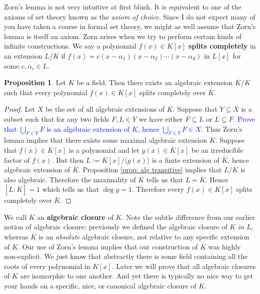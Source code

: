 \documentclass[11pt]{article}
\theoremstyle{definition}
\newtheorem{proposition}[theorem]{Proposition}
\numberwithin{equation}{subsection}
\newcommand{\blue}[1]{\textcolor{blue}{#1}}
\begin{document}
Zorn's lemma is not very intuitive at first blush.
It is equivalent to one of the axioms of set theory known as the \emph{axiom of choice}.
Since I do not expect many of you have taken a course in formal set theory, we might as well assume that Zorn's lemma is itself an axiom.
Zorn arises when we try to perform certain kinds of infinite constructions.
We say a polynomial $f(x) \in K[x]$ \textbf{splits completely} in an extension $L/K$ if $f(x) = c(x - \alpha_1)(x - \alpha_2)\cdots (x - \alpha_d)$ in $L[x]$ for some $c, \alpha_i \in L$.

\begin{proposition}
    Let $K$ be a field.
    Then there exists an algebraic extension $\overline{K}/K$ such that every polynomial $f(x) \in K[x]$ splits completely over $\overline{K}$. 
\end{proposition}

\begin{proof}
    Let $X$ be the set of all algebraic extensions of $K$.
    Suppose that $Y \subseteq X$ is a subset such that for any two fields $F, L \in Y$ we have either $F \subseteq L$ or $L \subseteq F$.
    \blue{Prove that $\bigcup_{F \in Y} F$ is an algebraic extension of $K$, hence $\bigcup_{F \in Y} F \in X$.}
    Thus Zorn's lemma implies that there exists some maximal algebraic extension $\overline{K}$.
    Suppose that $f(x) \in K[x]$ is a polynomial and let $g(x) \in \overline{K}[x]$ be an irreducible factor of $f(x)$. 
    But then $L := \overline{K}[x]/\langle g(x)\rangle$ is a finite extension of $\overline{K}$, hence algebraic extension of $\overline{K}$.
    Proposition \ref{prop: alg transitive} implies that $L/K$ is also algebraic.
    Therefore the maximality of $\overline{K}$ tells us that $L = \overline{K}$.
    Hence $[L : \overline{K}] = 1$ which tells us that $\deg g = 1$.
    Therefore every $f(x) \in K[x]$ splits completely over $\overline{K}$.
\end{proof}

We call $\overline{K}$ an \textbf{algebraic closure} of $K$.
Note the subtle difference from our earlier notion of algebraic closure: previously we defined the algebraic closure of $K$ \emph{in $L$}, whereas $\overline{K}$ is an \emph{absolute} algebraic closure, not relative to any specific extension of $K$.
Our use of Zorn's lemma implies that our construction of $\overline{K}$ was highly non-explicit.
We just know that abstractly there is some field containing all the roots of every polynomial in $K[x]$.
Later we will prove that all algebraic closures of $K$ are isomorphic to one another.
And yet there is typically no nice way to get your hands on a specific, nice, or canonical algebraic closure of $K$.
\end{document}
